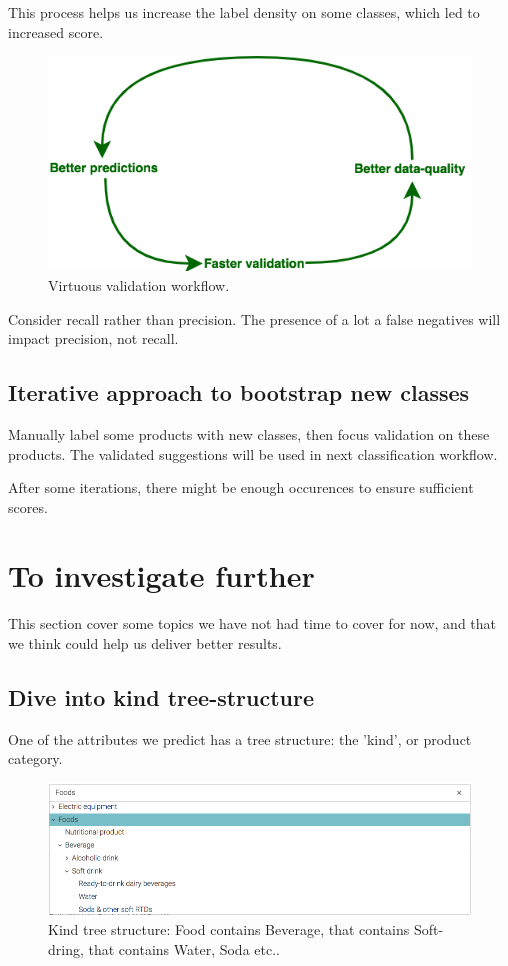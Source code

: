 This process helps us increase the label density on some classes, which led to increased score.

\begin{figure}[H]
\centering
\includegraphics[scale=0.6]{./images/incompletely-labeled/virtuous-circle.png}
\caption{Virtuous validation workflow.}
\end{figure}


Consider recall rather than precision. The presence of a lot a false negatives will impact precision, not recall.

\subsection{Iterative approach to bootstrap new classes}
Manually label some products with new classes, then focus validation on these products. The validated suggestions will be used in next classification workflow.

After some iterations, there might be enough occurences to ensure sufficient scores.

\section{To investigate further}

This section cover some topics we have not had time to cover for now, and that we think could help us deliver better results.

\subsection{Dive into kind tree-structure}
One of the attributes we predict has a tree structure: the 'kind', or product category. 

\begin{figure}[H]
\centering
\includegraphics[scale=0.5]{./images/to-investigate/tree-structure.png}
\caption{Kind tree structure: Food contains Beverage, that contains Soft-dring, that contains Water, Soda etc..}
\end{figure}

